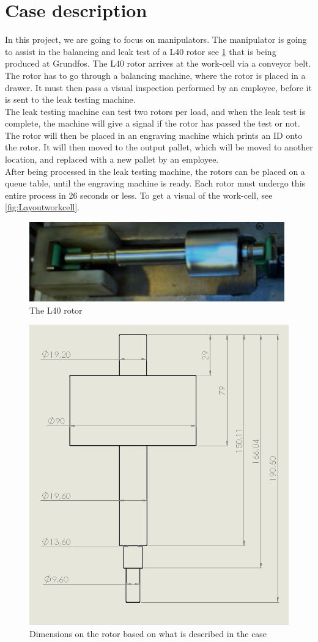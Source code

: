 \section{Case description} \label{ch:case description}

In this project, we are going to focus on manipulators.
The manipulator is going to assist in the balancing and leak test of a L40 rotor see \ref{fig:rotor} that is being produced at Grundfos. The L40 rotor arrives at the work-cell via a conveyor belt. The rotor has to go through a balancing machine, where the rotor is placed in a drawer. It must then pass a visual inspection performed by an employee, before it is sent to the leak testing machine.\\
The leak testing machine can test two rotors per load, and when the leak test is complete, the machine will give a signal if the rotor has passed the test or not. The rotor will then be placed in an engraving machine which prints an ID onto the rotor. It will then moved to the output pallet, which will be moved to another location, and replaced with a new pallet by an employee.\\ 
After being processed in the leak testing machine, the rotors can be placed on a queue table, until the engraving machine is ready. Each rotor must undergo this entire process in 26 seconds or less. To get a visual of the work-cell, see \ref{fig:Layoutworkcell}.\\

\begin{figure}[H]
    \centering
    \includegraphics[width=.48\textwidth]{InitialProblemstatement/Case/rotorlille.PNG}
    \caption{The L40 rotor}
    \label{fig:rotor}
\end{figure}

\begin{figure}[H]
    \centering
    \includegraphics[width=.70\textwidth]{InitialProblemstatement/Case/rotordims.PNG}
    \caption{Dimensions on the rotor based on what is described in the case\cite{Case}}
    \label{fig:rotor_dims}
\end{figure}


\newpage

